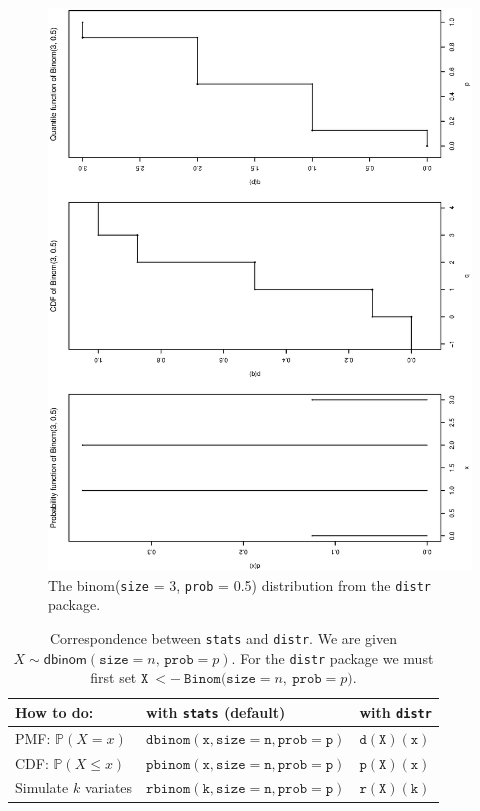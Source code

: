 \documentclass[captions=tableheading]{scrbook}
\begin{document}
\begin{figure}[th]
  \includegraphics[angle=270, totalheight=4in]{ps/discdist/binom-plot-distr.ps}
  \caption[The \textsf{binom}(\texttt{size} = 3, \texttt{prob} = 0.5) distribution from the \texttt{distr} package]{\small The \textsf{binom}(\texttt{size} = 3, \texttt{prob} = 0.5) distribution from the \texttt{distr} package.}
  \label{fig-binom-plot-distr}
\end{figure}


\begin{table}[htb]
\caption[Correspondence between \texttt{stats} and \texttt{distr}.]{Correspondence between \texttt{stats} and \texttt{distr}. We are given \(X\sim\mathsf{dbinom}(\mathtt{size}=n,\,\mathtt{prob}=p)\).  For the \texttt{distr} package we must first set \(\mathtt{X\ <-\ Binom(size=}n\mathtt{,\ prob=}p\mathtt{)}\).} 
\begin{center}
\begin{tabular}{lll}
 How to do:                     &  with \texttt{stats} (default)         &  with \texttt{distr}   \\
\hline
 PMF: \(\mathbb{P}(X=x)\)       &  \(\mathtt{dbinom(x,size=n,prob=p)}\)  &  \(\mathtt{d(X)(x)}\)  \\
 CDF:  \(\mathbb{P}(X\leq x)\)  &  \(\mathtt{pbinom(x,size=n,prob=p)}\)  &  \(\mathtt{p(X)(x)}\)  \\
 Simulate \(k\) variates        &  \(\mathtt{rbinom(k,size=n,prob=p)}\)  &  \(\mathtt{r(X)(k)}\)  \\
\hline
\end{tabular}
\end{center}
\end{table}
\end{document}

